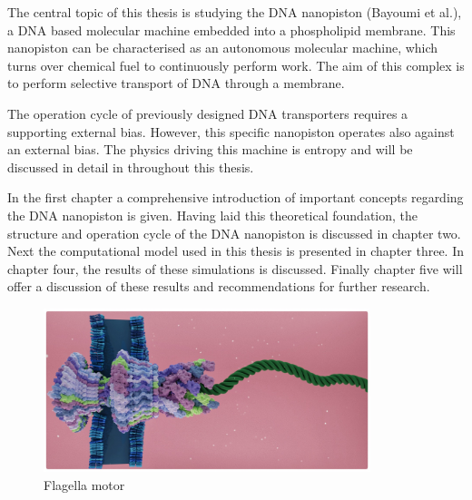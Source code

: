 The central topic of this thesis is studying the DNA nanopiston (Bayoumi et
al.\cite{Bayoumi21}), a DNA based molecular machine embedded into a phospholipid
membrane. This
nanopiston can be characterised as an autonomous molecular machine, which turns over
chemical fuel to continuously perform work. The aim of this complex is to perform
selective transport of DNA through a membrane.

The operation cycle of previously designed DNA transporters requires a supporting
external bias.\cite{Franceschini2013} However, this specific nanopiston operates also
against an external bias. The physics driving this machine is entropy and will be
discussed in detail in throughout this thesis.

In the first chapter a comprehensive introduction of important concepts
regarding the DNA nanopiston is given. Having laid this theoretical foundation, the
structure and operation cycle of the DNA nanopiston is discussed in chapter two. Next the
computational model used in this thesis is presented in chapter three. In chapter four,
the results of these simulations is discussed. Finally chapter five will offer a
discussion of these results and recommendations for further research.
\vspace{0.5cm}
\begin{figure}[ht]
\begin{center}
  \includegraphics[width=0.85\textwidth]{Figures/flagella2.png}
  \caption{Flagella motor \cite{Tan2021, blender, ChimeraX}}
\end{center}
\end{figure}
